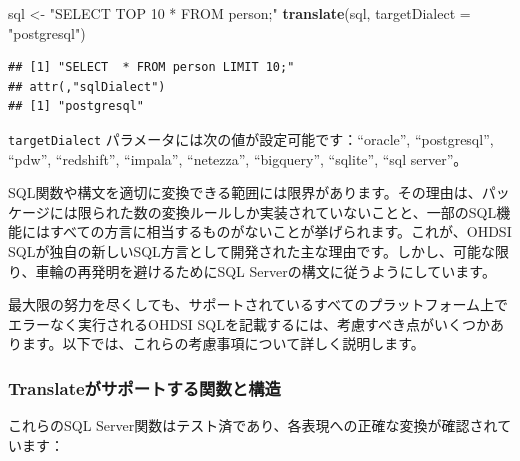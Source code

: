 \documentclass[
  11pt]{book}
\makeatletter
\newenvironment{Shaded}{\begin{snugshade}}{\end{snugshade}}
\newcommand{\AttributeTok}[1]{\textcolor[rgb]{0.13,0.29,0.53}{#1}}
\newcommand{\FunctionTok}[1]{\textcolor[rgb]{0.13,0.29,0.53}{\textbf{#1}}}
\newcommand{\NormalTok}[1]{#1}
\newcommand{\OtherTok}[1]{\textcolor[rgb]{0.56,0.35,0.01}{#1}}
\newcommand{\StringTok}[1]{\textcolor[rgb]{0.31,0.60,0.02}{#1}}
\newenvironment{kframe}{%
\medskip{}
\setlength{\fboxsep}{.8em}
 \def\at@end@of@kframe{}%
 \ifinner\ifhmode%
  \def\at@end@of@kframe{\end{minipage}}%
  \begin{minipage}{\columnwidth}%
 \fi\fi%
 \def\FrameCommand##1{\hskip\@totalleftmargin \hskip-\fboxsep
 \colorbox{myShadeColor}{##1}\hskip-\fboxsep
     \hskip-\linewidth \hskip-\@totalleftmargin \hskip\columnwidth}%
 \MakeFramed {\advance\hsize-\width
   \@totalleftmargin\z@ \linewidth\hsize
   \@setminipage}}%
 {\par\unskip\endMakeFramed%
 \at@end@of@kframe}
\newenvironment{rmdblock}[1]
  {
  \begin{itemize}
  \renewcommand{\labelitemi}{
    \raisebox{-.7\height}[0pt][0pt]{
      {\setkeys{Gin}{width=3em,keepaspectratio}\texttt{[image: images/\#1]}}
    }
  }
  \setlength{\fboxsep}{1em}
  \begin{kframe}
  \item
  }
  {
  \end{kframe}
  \end{itemize}
  }
\newenvironment{rmdimportant}
  {\begin{rmdblock}{important}}
  {\end{rmdblock}}
\theoremstyle{definition}
\theoremstyle{definition}
\theoremstyle{definition}
\theoremstyle{definition}
\theoremstyle{remark}
\makeatother
\begin{document}
\begin{Shaded}
\begin{Highlighting}[]
\NormalTok{sql }\OtherTok{\textless{}{-}} \StringTok{"SELECT TOP 10 * FROM person;"}
\FunctionTok{translate}\NormalTok{(sql, }\AttributeTok{targetDialect =} \StringTok{"postgresql"}\NormalTok{)}
\end{Highlighting}
\end{Shaded}

\begin{verbatim}
## [1] "SELECT  * FROM person LIMIT 10;"
## attr(,"sqlDialect")
## [1] "postgresql"
\end{verbatim}

\texttt{targetDialect} パラメータには次の値が設定可能です：``oracle'', ``postgresql'', ``pdw'', ``redshift'', ``impala'', ``netezza'', ``bigquery'', ``sqlite'', ``sql server''。 

\begin{rmdimportant}
SQL関数や構文を適切に変換できる範囲には限界があります。その理由は、パッケージには限られた数の変換ルールしか実装されていないことと、一部のSQL機能にはすべての方言に相当するものがないことが挙げられます。これが、OHDSI SQLが独自の新しいSQL方言として開発された主な理由です。しかし、可能な限り、車輪の再発明を避けるためにSQL Serverの構文に従うようにしています。
\end{rmdimportant}

最大限の努力を尽くしても、サポートされているすべてのプラットフォーム上でエラーなく実行されるOHDSI SQLを記載するには、考慮すべき点がいくつかあります。以下では、これらの考慮事項について詳しく説明します。

\subsubsection*{Translateがサポートする関数と構造}\label{translateux304cux30b5ux30ddux30fcux30c8ux3059ux308bux95a2ux6570ux3068ux69cbux9020}

これらのSQL Server関数はテスト済であり、各表現への正確な変換が確認されています：
\end{document}
